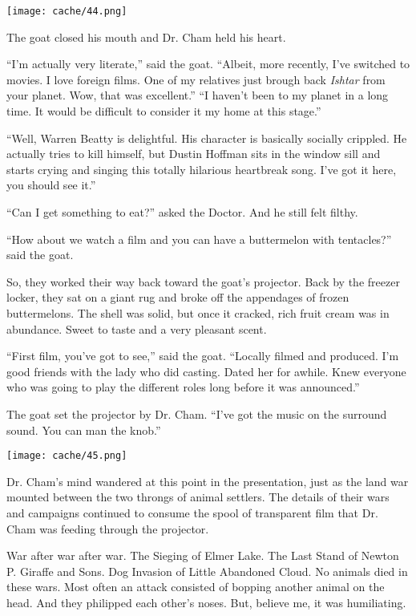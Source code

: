 \documentclass[12pt,twoside]{report}
\begin{document}
	\texttt{[image: cache/44.png]}

The goat closed his mouth and Dr. Cham held his heart.

``I'm actually very literate,'' said the goat.  ``Albeit, more
recently, I've switched to movies.  I love foreign films.  One of my
relatives just brough back {\em Ishtar} from your planet.  Wow, that
was excellent.''  ``I haven't been to my planet in a long time.  It
would be difficult to consider it my home at this stage.''

``Well, Warren Beatty is delightful.  His character is basically
socially crippled.  He actually tries to kill himself, but Dustin
Hoffman sits in the window sill and starts crying and singing this
totally hilarious heartbreak song.  I've got it here, you should see
it.''

``Can I get something to eat?'' asked the Doctor.  And he still felt
filthy.

``How about we watch a film and you can have a buttermelon with
tentacles?'' said the goat.

So, they worked their way back toward the goat's projector.  Back by
the freezer locker, they sat on a giant rug and broke off the
appendages of frozen buttermelons.  The shell was solid, but once it
cracked, rich fruit cream was in abundance.  Sweet to taste and a very
pleasant scent.

``First film, you've got to see,'' said the goat.  ``Locally filmed
and produced.  I'm good friends with the lady who did casting.  Dated
her for awhile.  Knew everyone who was going to play the different
roles long before it was announced.''

The goat set the projector by Dr. Cham.  ``I've got the music on the
surround sound. You can man the knob.''

	\texttt{[image: cache/45.png]}

Dr. Cham's mind wandered at this point in the presentation, just as
the land war mounted between the two throngs of animal settlers.  The
details of their wars and campaigns continued to consume the spool of
transparent film that Dr. Cham was feeding through the projector.

War after war after war.  The Sieging of Elmer Lake.  The Last Stand
of Newton P. Giraffe and Sons.  Dog Invasion of Little Abandoned
Cloud.  No animals died in these wars.  Most often an attack consisted
of bopping another animal on the head.  And they philipped each
other's noses.  But, believe me, it was humiliating.
\end{document}
